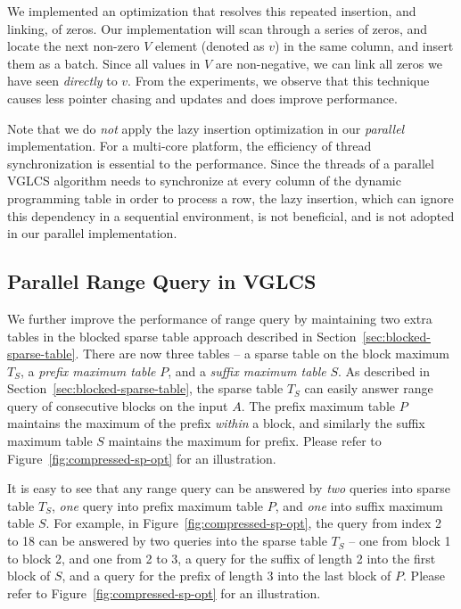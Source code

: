 We implemented an optimization that resolves this repeated insertion,
and linking, of zeros.  Our implementation will scan through a series of
zeros, and locate the next non-zero $V$ element (denoted as $v$) in the
same column, and insert them as a batch.  Since all values in $V$ are
non-negative, we can link all zeros we have seen {\em directly} to $v$.
From the experiments, we observe that this technique causes less pointer
chasing and updates and does improve performance.

Note that we do {\em not} apply the lazy insertion optimization in our
{\em parallel} implementation.  For a multi-core platform, the
efficiency of thread synchronization is essential to the performance.
Since the threads of a parallel VGLCS algorithm needs to synchronize at
every column of the dynamic programming table in order to process a row,
the lazy insertion, which can ignore this dependency in a sequential
environment, is not beneficial, and is not adopted in our parallel
implementation.

\subsection{Parallel Range Query in VGLCS}

We further improve the performance of range query by maintaining two
extra tables in the blocked sparse table approach described in
Section~\ref{sec:blocked-sparse-table}.  There are now three tables -- a
sparse table on the block maximum $T_S$, a {\em prefix maximum table}
$P$, and a {\em suffix maximum table} $S$.  As described in
Section~\ref{sec:blocked-sparse-table}, the sparse table $T_S$ can
easily answer range query of consecutive blocks on the input $A$.  The
prefix maximum table $P$ maintains the maximum of the prefix {\em
within} a block, and similarly the suffix maximum table $S$ maintains
the maximum for prefix.  Please refer to
Figure~\ref{fig:compressed-sp-opt} for an illustration.

It is easy to see that any range query can be answered by {\em two}
queries into sparse table $T_S$, {\em one} query into prefix maximum
table $P$, and {\em one} into suffix maximum table $S$.  For example, in
Figure~\ref{fig:compressed-sp-opt}, the query from index 2 to 18 can be
answered by two queries into the sparse table $T_S$ -- one from block 1
to block 2, and one from 2 to 3, a query for the suffix of length 2 into
the first block of $S$, and a query for the prefix of length 3 into the
last block of $P$.  Please refer to Figure~\ref{fig:compressed-sp-opt}
for an illustration.

